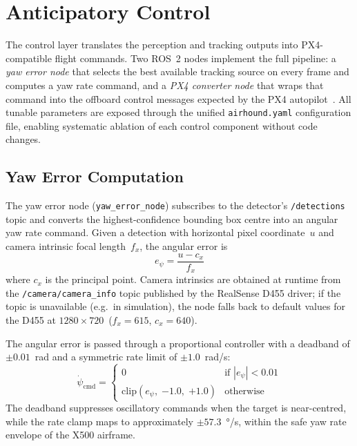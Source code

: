 \documentclass[11pt,letterpaper]{article}
\begin{document}
\section{Anticipatory Control}
\label{sec:control}

The control layer translates the perception and tracking outputs into
PX4-compatible flight commands.  Two ROS~2 nodes implement the full
pipeline: a \emph{yaw error node} that selects the best available
tracking source on every frame and computes a yaw rate command, and a
\emph{PX4 converter node} that wraps that command into the offboard
control messages expected by the PX4 autopilot~\cite{px4docs}.
All tunable parameters are exposed through the unified
\texttt{airhound.yaml} configuration file, enabling systematic
ablation of each control component without code changes.

\subsection{Yaw Error Computation}
\label{sec:yaw_error}

The yaw error node (\texttt{yaw\_error\_node}) subscribes to the
detector's \texttt{/detections} topic and converts the highest-confidence
bounding box centre into an angular yaw rate command.
Given a detection with horizontal pixel coordinate~$u$ and camera
intrinsic focal length~$f_x$, the angular error is
\begin{equation}
    e_{\psi} = \frac{u - c_x}{f_x}
    \label{eq:yaw_err}
\end{equation}
where $c_x$ is the principal point.  Camera intrinsics are obtained at
runtime from the \texttt{/camera/camera\_info} topic published by the
RealSense D455 driver; if the topic is unavailable (e.g.\ in simulation),
the node falls back to default values for the D455 at
$1280\times720$~($f_x = 615$, $c_x = 640$).

The angular error is passed through a proportional controller with a
deadband of $\pm 0.01$~rad and a symmetric rate limit of
$\pm 1.0$~rad/s:
\begin{equation}
    \dot{\psi}_{\mathrm{cmd}} =
        \begin{cases}
            0 & \text{if } |e_{\psi}| < 0.01 \\[2pt]
            \mathrm{clip}(e_{\psi},\; {-1.0},\; {+1.0}) & \text{otherwise}
        \end{cases}
    \label{eq:yaw_rate}
\end{equation}
The deadband suppresses oscillatory commands when the target is
near-centred, while the rate clamp maps to approximately
$\pm 57.3$~\si{\degree/s}, within the safe yaw rate envelope of the
X500 airframe.
\end{document}
